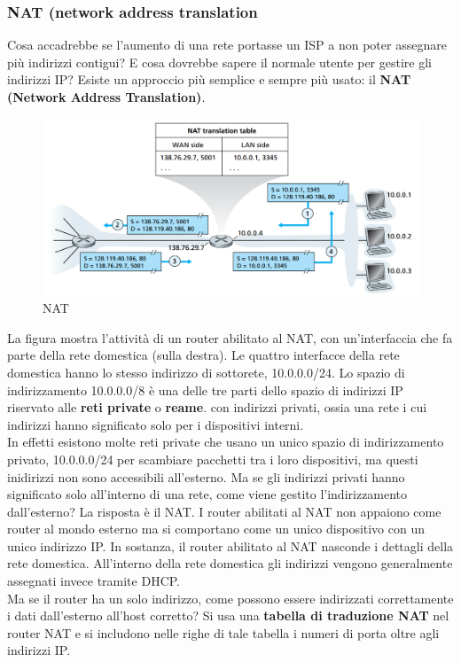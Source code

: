 \documentclass[11pt,a4paper]{article}
\begin{document}
\subsubsection{NAT (network address translation}
Cosa accadrebbe se l'aumento di una rete portasse un ISP a non poter assegnare più indirizzi contigui? E cosa dovrebbe sapere il normale utente per gestire gli indirizzi IP? Esiste un approccio più semplice e sempre più usato: il \textbf{NAT (Network Address Translation)}.
\begin{figure}
	\includegraphics[scale=0.4]{img/058.png}
	\caption{NAT}
\end{figure}
La figura mostra l'attività di un router abilitato al NAT, con un'interfaccia che fa parte della rete domestica (sulla destra). Le quattro interfacce della rete domestica hanno lo stesso indirizzo di sottorete, 10.0.0.0/24. Lo spazio di indirizzamento 10.0.0.0/8 è una delle tre parti dello spazio di indirizzi IP riservato alle \textbf{reti private} o \textbf{reame}. con indirizzi privati, ossia una rete i cui indirizzi hanno significato solo per i dispositivi interni. \\
In effetti esistono molte reti private che usano un unico spazio di indirizzamento privato, 10.0.0.0/24 per scambiare pacchetti tra i loro dispositivi, ma questi inidirizzi non sono accessibili all'esterno. Ma se gli indirizzi privati hanno significato solo all'interno di una rete, come viene gestito l'indirizzamento dall'esterno? La risposta è il NAT. I router abilitati al NAT non appaiono come router al mondo esterno ma si comportano come un unico dispositivo con un unico indirizzo IP. In sostanza, il router abilitato al NAT nasconde i dettagli della rete domestica. All'interno della rete domestica gli indirizzi vengono generalmente assegnati invece tramite DHCP. \\
Ma se il router ha un solo indirizzo, come possono essere indirizzati correttamente i dati dall'esterno all'host corretto? Si usa una \textbf{tabella di traduzione NAT} nel router NAT e si includono nelle righe di tale tabella i numeri di porta oltre agli indirizzi IP. \\
\end{document}
